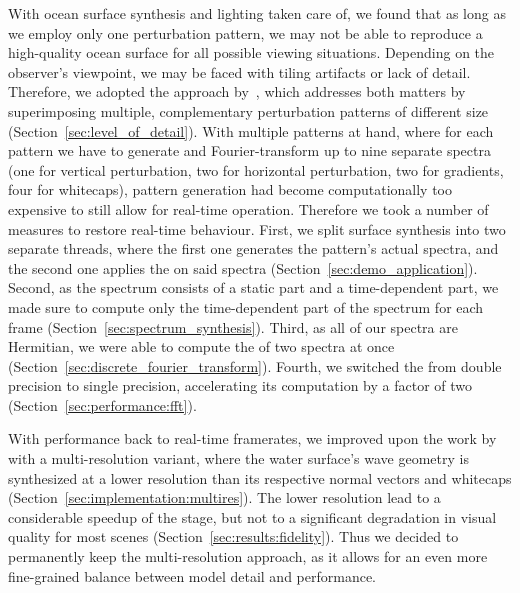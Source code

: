 With ocean surface synthesis and lighting taken care of, we found that
as long as we employ only one perturbation pattern, we may not
be able to reproduce a high-quality ocean surface for all possible
viewing situations. Depending on the observer's viewpoint, we may be
faced with tiling artifacts or lack of detail.
Therefore, we adopted the approach by~\citet{misc:oceanlightingfft},
which addresses both matters by superimposing multiple, complementary perturbation
patterns of different size (Section~\ref{sec:level_of_detail}).
With multiple patterns at hand, where for each pattern we have to
generate and Fourier-transform up to nine separate spectra (one for vertical
perturbation, two for horizontal perturbation, two for gradients,
four for whitecaps), pattern generation had become computationally too
expensive to still allow for real-time operation.
Therefore we took a number of measures to restore real-time behaviour.
First, we split surface synthesis into two separate threads, where the first
one generates the pattern's actual spectra, and the second one
applies the \InvFourierTransform on said spectra (Section~\ref{sec:demo_application}).
Second, as the spectrum consists of a static part and a time-dependent part,
we made sure to compute only the time-dependent part of the spectrum for each
frame (Section~\ref{sec:spectrum_synthesis}).
Third, as all of our spectra are Hermitian, we were able to compute the
\InvFourierTransform of two spectra at once (Section~\ref{sec:discrete_fourier_transform}).
Fourth, we switched the \InvFourierTransform from double precision to single
precision, accelerating its computation by a factor of two
(Section~\ref{sec:performance:fft}).

With performance back to real-time framerates, we improved upon the work by
\citet{misc:oceanlightingfft} with a multi-resolution variant, where
the water surface's wave geometry is synthesized at a lower resolution
than its respective normal vectors and whitecaps
(Section~\ref{sec:implementation:multires}).
The lower resolution lead to a considerable speedup of the \FourierTransform
stage, but not to a significant degradation in visual quality for most scenes
(Section~\ref{sec:results:fidelity}).
Thus we decided to permanently keep the multi-resolution approach, as it
allows for an even more fine-grained balance between model detail and performance.
%

